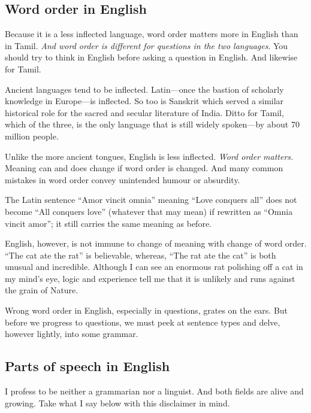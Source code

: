 \documentclass[
  11pt,
  british,
  a4paper,
]{article}
\begin{document}
\hypertarget{word-order-in-english}{%
\subsection{Word order in English}\label{word-order-in-english}}

Because it is a less inflected language, word order matters more in
English than in Tamil. \emph{And word order is different for questions
in the two languages}. You should try to think in English before asking
a question in English. And likewise for Tamil.

Ancient languages tend to be inflected. Latin---once the bastion of
scholarly knowledge in Europe---is inflected. So too is Sanskrit which
served a similar historical role for the sacred and secular literature
of India. Ditto for Tamil, which of the three, is the only language that
is still widely spoken---by about 70 million people.

Unlike the more ancient tongues, English is less inflected. \emph{Word
order matters.} Meaning can and does change if word order is changed.
And many common mistakes in word order convey unintended humour or
absurdity.

The Latin sentence ``Amor vincit omnia'' meaning ``Love conquers all''
does not become ``All conquers love'' (whatever that may mean) if
rewritten as ``Omnia vincit amor''; it still carries the same meaning as
before.

English, however, is not immune to change of meaning with change of word
order. ``The cat ate the rat'' is believable, whereas, ``The rat ate the
cat'' is both unusual and incredible. Although I can see an enormous rat
polishing off a cat in my mind's eye, logic and experience tell me that
it is unlikely and runs against the grain of Nature.

Wrong word order in English, especially in questions, grates on the
ears. But before we progress to questions, we must peek at sentence
types and delve, however lightly, into some grammar.

\hypertarget{parts-of-speech-in-english}{%
\subsection{Parts of speech in
English}\label{parts-of-speech-in-english}}

I profess to be neither a grammarian nor a linguist. And both fields are
alive and growing. Take what I say below with this disclaimer in mind.
\end{document}
